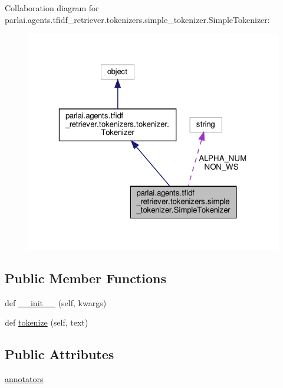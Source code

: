 Collaboration diagram for parlai.\+agents.\+tfidf\+\_\+retriever.\+tokenizers.\+simple\+\_\+tokenizer.\+Simple\+Tokenizer\+:
\nopagebreak
\begin{figure}[H]
\begin{center}
\leavevmode
\includegraphics[width=323pt]{classparlai_1_1agents_1_1tfidf__retriever_1_1tokenizers_1_1simple__tokenizer_1_1SimpleTokenizer__coll__graph}
\end{center}
\end{figure}
\subsection*{Public Member Functions}
\begin{DoxyCompactItemize}
\item 
def \hyperlink{classparlai_1_1agents_1_1tfidf__retriever_1_1tokenizers_1_1simple__tokenizer_1_1SimpleTokenizer_a6a038fd66269e0a8e76e62260b13f4d9}{\+\_\+\+\_\+init\+\_\+\+\_\+} (self, kwargs)
\item 
def \hyperlink{classparlai_1_1agents_1_1tfidf__retriever_1_1tokenizers_1_1simple__tokenizer_1_1SimpleTokenizer_a690bc237be6349de5c3f105e0be37ea7}{tokenize} (self, text)
\end{DoxyCompactItemize}
\subsection*{Public Attributes}
\begin{DoxyCompactItemize}
\item 
\hyperlink{classparlai_1_1agents_1_1tfidf__retriever_1_1tokenizers_1_1simple__tokenizer_1_1SimpleTokenizer_aa2edbea9c08e8b1fbe5eef7d61e3f432}{annotators}
\end{DoxyCompactItemize}
